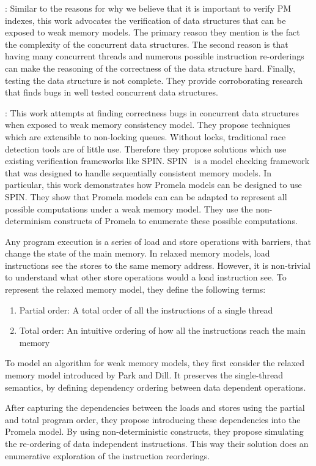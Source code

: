 : Similar to the reasons for why we believe that it
is important to verify PM indexes, this work advocates the verification of data
structures that can be exposed to weak memory models. The primary reason they mention
is the fact the complexity of the concurrent data structures. The second reason is that
having many concurrent threads and numerous possible instruction re-orderings can
make the reasoning of the correctness of the data structure hard. Finally, testing the
data structure is not complete. They provide corroborating research that finds bugs
in well tested concurrent data structures.

: This work attempts at finding correctness bugs in
concurrent data structures when exposed to weak memory consistency model. They propose
techniques which are extensible to non-locking queues. Without locks, traditional
race detection tools are of little use. Therefore they propose solutions which use
existing verification frameworks like SPIN. SPIN~\cite{Lwn.net-Spin,Lwn.net-Verify}
is a model checking framework that was designed to handle sequentially consistent
memory models. In particular, this work demonstrates how Promela models can be designed
to use SPIN. They show that Promela models can can be adapted to represent all possible
computations under a weak memory model. They use the non-determinism constructs of
Promela to enumerate these possible computations.

Any program execution is a series of load and store operations with barriers,
that change the state of the main memory. In relaxed memory models, load
instructions see the stores to the same memory address. However, it is
non-trivial to understand what other store operations would a load instruction
see. To represent the relaxed memory model, they define the following terms:
\begin{enumerate}
	\item Partial order: A total order of all the instructions of a single thread
    \item Total order: An intuitive ordering of how all the instructions reach
    the main memory
\end{enumerate}
To model an algorithm for weak memory models, they first consider the relaxed
memory model introduced by Park and Dill. It preserves the single-thread
semantics, by defining dependency ordering between data dependent operations.

After capturing the dependencies between the loads and stores using the partial
and total program order, they propose introducing these dependencies into the
Promela model. By using non-deterministic constructs, they propose simulating
the re-ordering of data independent instructions. This way their solution does
an enumerative exploration of the instruction reorderings.

